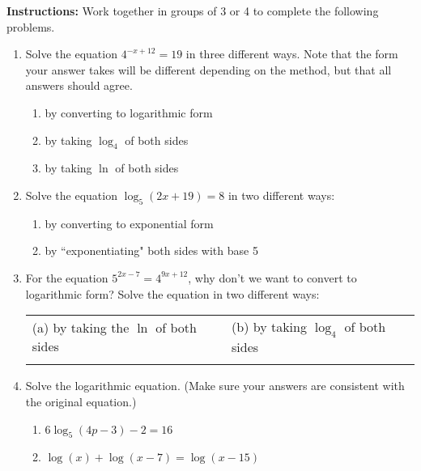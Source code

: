 



\noindent \textbf{Instructions:}  Work together in groups of  3 or 4 to complete the following problems.\\


\begin{enumerate}
\item Solve the equation $\displaystyle 4^{-x+12}=19$ in three different ways.  Note that the form your answer takes will be different depending on the method, but that all answers should agree.
\begin{enumerate}
\item by converting to logarithmic form \vfill
\item by taking $\displaystyle \log_4$ of both sides\vfill
\item by taking $\ln$ of both sides\vfill
\end{enumerate}

\clearpage
\item Solve the equation $\log_5(2x+19)=8$ in two different ways:
\begin{enumerate}
\item by converting to exponential form\\[1in]
\item by ``exponentiating" both sides with base 5\\[1in]
\end{enumerate}



\item For the equation $5^{2x-7}=4^{9x+12}$, why don't we want to convert to logarithmic form? Solve the equation in two different ways:


\begin{tabular}{p{} | p{}} 
(a) by taking the $\ln$ of both sides\hspace{1in} & (b) by taking $\log_4$ of both sides\\
& \rule{0cm}{0.5\textheight}  \\ 
\end{tabular} 

\vfill

\clearpage

\item Solve the logarithmic equation. (Make sure your answers are
  consistent with the original equation.)
\begin{enumerate}
\item $6\log_5(4p-3)-2=16$\vfill
\item $\log(x)+\log(x-7)=\log(x-15)$\vfill
\end{enumerate}



\end{enumerate}
